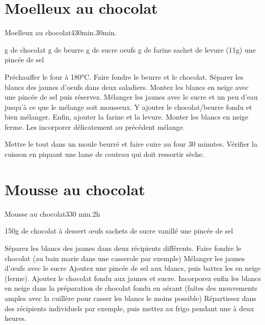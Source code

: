 {\section{Moelleux au chocolat}
\begin{recette}{Moelleux au chocolat}{4}{30min.}{30min.}
\begin{ingredients}
 g de chocolat
 g de beurre
 g de sucre
 oeufs
 g de farine
 sachet de levure (11g)
\ingredient une pincée de sel
\end{ingredients}

\begin{preparation}
\etape Préchauffer le four à 180°C.
\etape Faire fondre le beurre et le chocolat.
\etape Séparer les blancs des jaunes d'oeufs dans deux saladiers.
\etape Montez les blancs en neige avec une pincée de sel puis réservez. 
\etape Mélanger les jaunes avec le sucre et un peu d'eau jusqu'à ce que le mélange soit mousseux. 
\etape Y ajouter le chocolat/beurre fondu et bien mélanger. Enfin, ajouter la farine et la levure.
\etape Monter les blancs en neige ferme. Les incorporer délicatement au précédent mélange. 
\end{preparation}

\begin{cuisson}
Mettre le tout dans un moule beurré et faire cuire au four 30 minutes. Vérifier la cuisson en piquant une lame de couteau qui doit ressortir sèche. 
\end{cuisson}
\end{recette}

\section{Mousse au chocolat}
\begin{recette}{Mousse au chocolat}{3}{30 min.}{2h}
\begin{ingredients}[4 personnes]
\ingredient 150g de chocolat à dessert
 œufs
 sachets de sucre vanillé
\ingredient une pincée de sel
\end{ingredients}

\begin{preparation}
\etape Séparez les blancs des jaunes dans deux récipients différents.
\etape Faire fondre le chocolat (au bain marie dans une casserole par exemple)
\etape Mélanger les jaunes d'œufs avec le sucre
\etape Ajoutez une pincée de sel aux blancs, puis battez les en neige (ferme).
\etape Ajoutez le chocolat fondu aux jaunes et sucre.
\etape Incorporez enfin les blancs en neige dans la préparation de chocolat fondu en aérant (faites des mouvements amples avec 
la cuillère pour casser les blancs le moins possible)
\etape Répartissez dans des récipients individuels par exemple, puis mettez au frigo pendant une à deux heures.
\end{preparation}
\end{recette}


}
